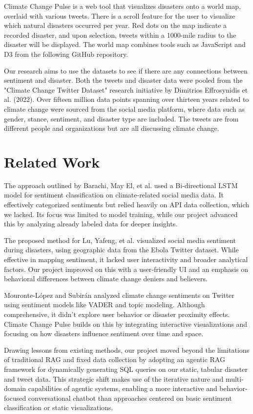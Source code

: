 \documentclass{ieeeaccess}
\begin{document}
Climate Change Pulse is a web tool that visualizes disasters onto a world map, overlaid with various tweets. There is a scroll feature for the user to visualize which natural disasters occurred per year. Red dots on the map indicate a recorded disaster, and upon selection, tweets within a 1000-mile radius to the disaster will be displayed. The world map combines tools such as JavaScript and D3 from the following GitHub repository.

Our research aims to use the datasets to see if there are any connections between sentiment and disaster. Both the tweets and disaster data were pooled from the "Climate Change Twitter Dataset" research initiative by Dimitrios Effrosynidis et al. (2022). Over fifteen million data points spanning over thirteen years related to climate change were sourced from the social media platform, where data such as gender, stance, sentiment, and disaster type are included. The tweets are from different people and organizations but are all discussing climate change.

\section{Related Work}
\label{sec:related_work}

The approach outlined by Barachi, May El, et al. used a Bi-directional LSTM model for sentiment classification on climate-related social media data. It effectively categorized sentiments but relied heavily on API data collection, which we lacked. Its focus was limited to model training, while our project advanced this by analyzing already labeled data for deeper insights.

The proposed method for Lu, Yafeng, et al. visualized social media sentiment during disasters, using geographic data from the Ebola Twitter dataset. While effective in mapping sentiment, it lacked user interactivity and broader analytical factors. Our project improved on this with a user-friendly UI and an emphasis on behavioral differences between climate change deniers and believers.

Mouronte-López and Subirán analyzed climate change sentiments on Twitter using sentiment models like VADER and topic modeling. Although comprehensive, it didn't explore user behavior or disaster proximity effects. Climate Change Pulse builds on this by integrating interactive visualizations and focusing on how disasters influence sentiment over time and space.

Drawing lessons from existing methods, our project moved beyond the limitations of traditional RAG and fixed data collection by adopting an agentic RAG framework for dynamically generating SQL queries on our static, tabular disaster and tweet data. This strategic shift makes use of the iterative nature and multi-domain capabilities of agentic systems, enabling a more interactive and behavior-focused conversational chatbot than approaches centered on basic sentiment classification or static visualizations.
\end{document}
